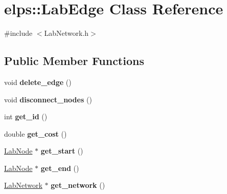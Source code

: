 \hypertarget{classelps_1_1_lab_edge}{\section{elps\+:\+:Lab\+Edge Class Reference}
\label{classelps_1_1_lab_edge}
}


{\ttfamily \#include $<$Lab\+Network.\+h$>$}

\subsection*{Public Member Functions}
\begin{DoxyCompactItemize}
\item 
\hypertarget{classelps_1_1_lab_edge_adb136dcf18cfd3632331bc6edd22faf9}{void {\bfseries delete\+\_\+edge} ()}\label{classelps_1_1_lab_edge_adb136dcf18cfd3632331bc6edd22faf9}

\item 
\hypertarget{classelps_1_1_lab_edge_a411f8366435790b9677cdaae0ac758fd}{void {\bfseries disconnect\+\_\+nodes} ()}\label{classelps_1_1_lab_edge_a411f8366435790b9677cdaae0ac758fd}

\item 
\hypertarget{classelps_1_1_lab_edge_aed0c2f166191dcacdcba5379d274e323}{int {\bfseries get\+\_\+id} ()}\label{classelps_1_1_lab_edge_aed0c2f166191dcacdcba5379d274e323}

\item 
\hypertarget{classelps_1_1_lab_edge_a164ddbea1bf4f00090caa0b6f8faa2c9}{double {\bfseries get\+\_\+cost} ()}\label{classelps_1_1_lab_edge_a164ddbea1bf4f00090caa0b6f8faa2c9}

\item 
\hypertarget{classelps_1_1_lab_edge_abe7529cac47b93372623283b996c67e5}{\hyperlink{classelps_1_1_lab_node}{Lab\+Node} $\ast$ {\bfseries get\+\_\+start} ()}\label{classelps_1_1_lab_edge_abe7529cac47b93372623283b996c67e5}

\item 
\hypertarget{classelps_1_1_lab_edge_ae8c80c89830ed1848e161eb40009fa6d}{\hyperlink{classelps_1_1_lab_node}{Lab\+Node} $\ast$ {\bfseries get\+\_\+end} ()}\label{classelps_1_1_lab_edge_ae8c80c89830ed1848e161eb40009fa6d}

\item 
\hypertarget{classelps_1_1_lab_edge_ac7f923e4fe44d3d2db820708c91f37da}{\hyperlink{classelps_1_1_lab_network}{Lab\+Network} $\ast$ {\bfseries get\+\_\+network} ()}\label{classelps_1_1_lab_edge_ac7f923e4fe44d3d2db820708c91f37da}


\end{DoxyCompactItemize}
